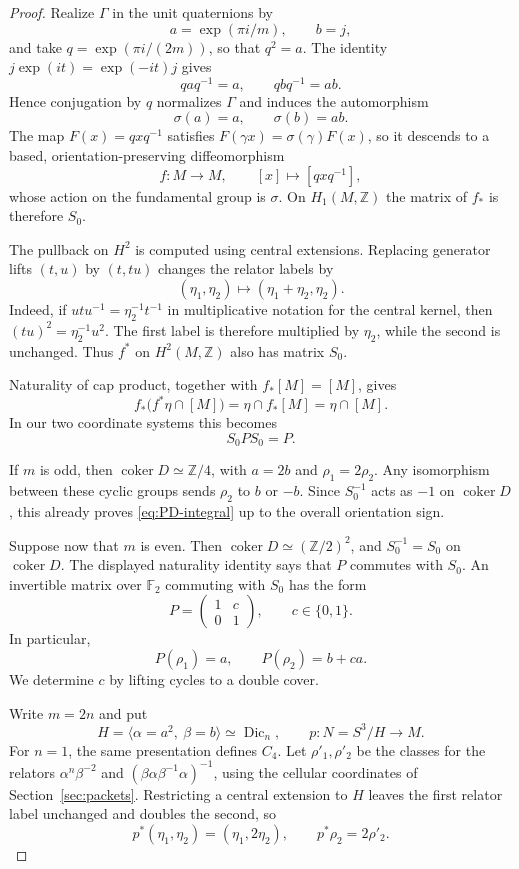 \documentclass[11pt,a4paper,reqno]{amsart}
\theoremstyle{plain}
\theoremstyle{definition}
\theoremstyle{remark}
\numberwithin{equation}{section}
\newcommand{\ZZ}{\mathbb Z}
\newcommand{\FF}{\mathbb F}
\DeclareMathOperator{\coker}{coker}
\newcommand{\Dic}{\operatorname{Dic}}
\begin{document}
\begin{proof}
Realize $\Gamma$ in the unit quaternions by
\[
a=\exp(\pi i/m),\qquad b=j,
\]
and take $q=\exp(\pi i/(2m))$, so that $q^2=a$. The identity $j\exp(it)=\exp(-it)j$ gives
\[
qaq^{-1}=a,\qquad qbq^{-1}=ab.
\]
Hence conjugation by $q$ normalizes $\Gamma$ and induces the automorphism
\[
\sigma(a)=a,\qquad \sigma(b)=ab.
\]
The map $F(x)=qxq^{-1}$ satisfies $F(\gamma x)=\sigma(\gamma)F(x)$, so it descends to a based, orientation-preserving diffeomorphism
\[
f\colon M\longrightarrow M,\qquad [x]\longmapsto[qxq^{-1}],
\]
whose action on the fundamental group is $\sigma$.
On $H_1(M,\ZZ)$ the matrix of $f_*$ is therefore $S_0$.

The pullback on $H^2$ is computed using central extensions. Replacing generator lifts $(t,u)$ by $(t,tu)$ changes the relator labels by
\[
(\eta_1,\eta_2)\longmapsto(\eta_1+\eta_2,\eta_2).
\]
Indeed, if $utu^{-1}=\eta_2^{-1}t^{-1}$ in multiplicative notation for the central kernel, then $(tu)^2=\eta_2^{-1}u^2$. The first label is therefore multiplied by $\eta_2$, while the second is unchanged. Thus $f^*$ on $H^2(M,\ZZ)$ also has matrix $S_0$.

Naturality of cap product, together with $f_*[M]=[M]$, gives
\[
f_*\bigl(f^*\eta\cap[M]\bigr)
=\eta\cap f_*[M]
=\eta\cap[M].
\]
In our two coordinate systems this becomes
\[
S_0PS_0=P.
\]

If $m$ is odd, then $\coker D\simeq\ZZ/4$, with $a=2b$ and $\rho_1=2\rho_2$. Any isomorphism between these cyclic groups sends $\rho_2$ to $b$ or $-b$. Since $S_0^{-1}$ acts as $-1$ on $\coker D$, this already proves \eqref{eq:PD-integral} up to the overall orientation sign.

Suppose now that $m$ is even. Then $\coker D\simeq(\ZZ/2)^2$, and $S_0^{-1}=S_0$ on $\coker D$. The displayed naturality identity says that $P$ commutes with $S_0$. An invertible matrix over $\FF_2$ commuting with $S_0$ has the form
\[
P=\begin{pmatrix}1&c\\0&1\end{pmatrix},\qquad c\in\{0,1\}.
\]
In particular,
\[
P(\rho_1)=a,\qquad P(\rho_2)=b+ca.
\]
We determine $c$ by lifting cycles to a double cover.

Write $m=2n$ and put
\[
H=\langle\alpha=a^2,\ \beta=b\rangle\simeq\Dic_n,
\qquad
p\colon N=S^3/H\longrightarrow M.
\]
For $n=1$, the same presentation defines $C_4$. Let $\rho'_1,\rho'_2$ be the classes for the relators $\alpha^n\beta^{-2}$ and $(\beta\alpha\beta^{-1}\alpha)^{-1}$, using the cellular coordinates of Section~\ref{sec:packets}. Restricting a central extension to $H$ leaves the first relator label unchanged and doubles the second, so
\[
p^*(\eta_1,\eta_2)=(\eta_1,2\eta_2),\qquad
p^*\rho_2=2\rho'_2.
\]


\end{proof}
\end{document}
